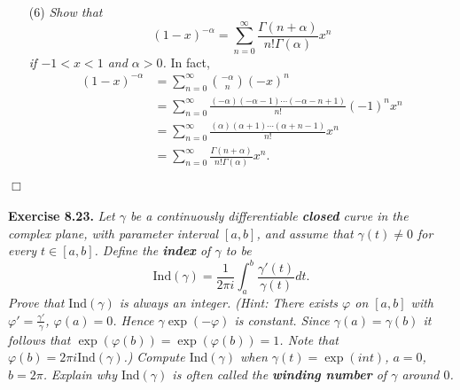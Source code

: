 \documentclass{article}
\begin{document}
\begin{enumerate}
\item[(6)]
\emph{Show that
\[
  (1-x)^{-\alpha} = \sum_{n=0}^{\infty} \frac{\Gamma(n+\alpha)}{n!\Gamma(\alpha)} x^n
\]
if $-1<x<1$ and $\alpha > 0$.}
In fact,
\begin{align*}
  (1-x)^{-\alpha}
  &= \sum_{n=0}^{\infty} {-\alpha \choose n} (-x)^n \\
  &= \sum_{n=0}^{\infty} \frac{(-\alpha)(-\alpha-1)\cdots(-\alpha-n+1)}{n!} (-1)^n x^n \\
  &= \sum_{n=0}^{\infty} \frac{(\alpha)(\alpha+1)\cdots(\alpha+n-1)}{n!} x^n \\
  &= \sum_{n=0}^{\infty} \frac{\Gamma(n+\alpha)}{n!\Gamma(\alpha)} x^n.
\end{align*}
\end{enumerate}
$\Box$ \\\\






\textbf{Exercise 8.23.}
\emph{Let $\gamma$ be a continuously differentiable \textbf{closed} curve in the complex plane,
with parameter interval $[a,b]$,
and assume that $\gamma(t) \neq 0$ for every $t \in [a,b]$.
Define the \textbf{index} of $\gamma$ to be
\[
  \mathrm{Ind}(\gamma)
  = \frac{1}{2\pi i}\int_{a}^{b} \frac{\gamma'(t)}{\gamma(t)} dt.
\]
Prove that $\mathrm{Ind}(\gamma)$ is always an integer.
(Hint: There exists $\varphi$ on $[a,b]$ with $\varphi' = \frac{\gamma'}{\gamma}$,
$\varphi(a) = 0$.
Hence $\gamma \exp(-\varphi)$ is constant.
Since $\gamma(a) = \gamma(b)$ it follows that $\exp(\varphi(b)) = \exp(\varphi(b)) = 1$.
Note that $\varphi(b) = 2\pi i \mathrm{Ind}(\gamma)$.)}
\emph{Compute $\mathrm{Ind}(\gamma)$ when $\gamma(t) = \exp(int)$, $a=0$, $b=2\pi$.}
\emph{Explain why $\mathrm{Ind}(\gamma)$ is often called the
\textbf{winding number} of $\gamma$ around $0$.} \\
\end{document}
